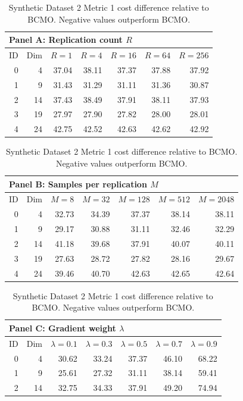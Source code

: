 \begin{table}[htbp]
\centering
\small
\setlength{\tabcolsep}{6pt}
\renewcommand{\arraystretch}{1.08}
\caption{Synthetic Dataset 2 Metric 1 cost difference relative to BCMO. Negative values outperform BCMO.}
\label{tab:synthetic_dataset_2_bcmo_difference_metric1}
\begin{tabular}{rrrrrrr}
\toprule
\multicolumn{7}{l}{\textbf{Panel A: Replication count $R$}} \\
\midrule
ID & Dim & $R=1$ & $R=4$ & $R=16$ & $R=64$ & $R=256$ \\
\midrule
0 & 4 & 37.04 & 38.11 & 37.37 & 37.88 & 37.92 \\
1 & 9 & 31.43 & 31.29 & 31.11 & 31.36 & 30.87 \\
2 & 14 & 37.43 & 38.49 & 37.91 & 38.11 & 37.93 \\
3 & 19 & 27.97 & 27.90 & 27.82 & 28.00 & 28.01 \\
4 & 24 & 42.75 & 42.52 & 42.63 & 42.62 & 42.92 \\
\bottomrule
\end{tabular}
\par\medskip
\begin{tabular}{rrrrrrr}
\toprule
\multicolumn{7}{l}{\textbf{Panel B: Samples per replication $M$}} \\
\midrule
ID & Dim & $M=8$ & $M=32$ & $M=128$ & $M=512$ & $M=2048$ \\
\midrule
0 & 4 & 32.73 & 34.39 & 37.37 & 38.14 & 38.11 \\
1 & 9 & 29.17 & 30.88 & 31.11 & 32.46 & 32.29 \\
2 & 14 & 41.18 & 39.68 & 37.91 & 40.07 & 40.11 \\
3 & 19 & 27.63 & 28.72 & 27.82 & 28.16 & 29.67 \\
4 & 24 & 39.46 & 40.70 & 42.63 & 42.65 & 42.64 \\
\bottomrule
\end{tabular}
\par\medskip
\begin{tabular}{rrrrrrr}
\toprule
\multicolumn{7}{l}{\textbf{Panel C: Gradient weight $\lambda$}} \\
\midrule
ID & Dim & $\lambda=0.1$ & $\lambda=0.3$ & $\lambda=0.5$ & $\lambda=0.7$ & $\lambda=0.9$ \\
\midrule
0 & 4 & 30.62 & 33.24 & 37.37 & 46.10 & 68.22 \\
1 & 9 & 25.61 & 27.32 & 31.11 & 38.14 & 59.41 \\
2 & 14 & 32.75 & 34.33 & 37.91 & 49.20 & 74.94 \\

\end{tabular}
\end{table}

